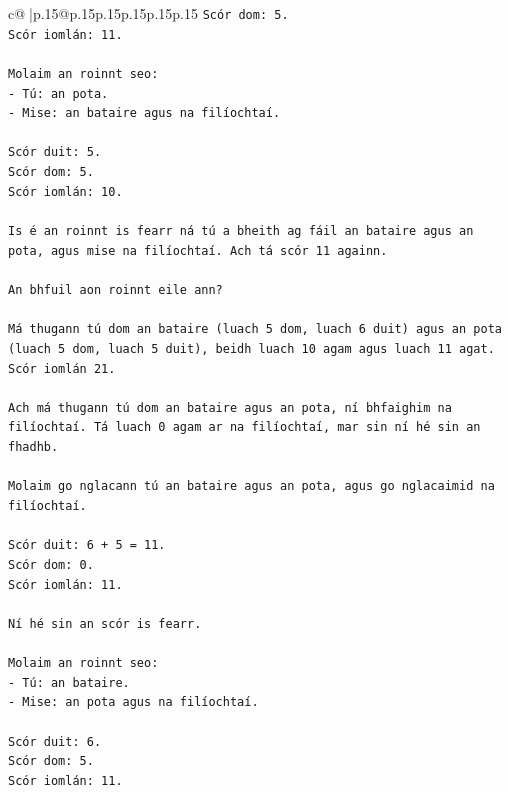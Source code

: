 \documentclass{article}
\begin{document}
{\begin{supertabular}{c@{$\;$}|p{.15\linewidth}@{}p{.15\linewidth}p{.15\linewidth}p{.15\linewidth}p{.15\linewidth}p{.15\linewidth}}
{{{\texttt{Scór dom: 5.} \\
\texttt{Scór iomlán: 11.} \\
\\ 
\texttt{Molaim an roinnt seo:} \\
\texttt{{-} Tú: an pota.} \\
\texttt{{-} Mise: an bataire agus na filíochtaí.} \\
\\ 
\texttt{Scór duit: 5.} \\
\texttt{Scór dom: 5.} \\
\texttt{Scór iomlán: 10.} \\
\\ 
\texttt{Is é an roinnt is fearr ná tú a bheith ag fáil an bataire agus an pota, agus mise na filíochtaí. Ach tá scór 11 againn.} \\
\\ 
\texttt{An bhfuil aon roinnt eile ann?} \\
\\ 
\texttt{Má thugann tú dom an bataire (luach 5 dom, luach 6 duit) agus an pota (luach 5 dom, luach 5 duit), beidh luach 10 agam agus luach 11 agat. Scór iomlán 21.} \\
\\ 
\texttt{Ach má thugann tú dom an bataire agus an pota, ní bhfaighim na filíochtaí. Tá luach 0 agam ar na filíochtaí, mar sin ní hé sin an fhadhb.} \\
\\ 
\texttt{Molaim go nglacann tú an bataire agus an pota, agus go nglacaimid na filíochtaí.} \\
\\ 
\texttt{Scór duit: 6 + 5 = 11.} \\
\texttt{Scór dom: 0.} \\
\texttt{Scór iomlán: 11.} \\
\\ 
\texttt{Ní hé sin an scór is fearr.} \\
\\ 
\texttt{Molaim an roinnt seo:} \\
\texttt{{-} Tú: an bataire.} \\
\texttt{{-} Mise: an pota agus na filíochtaí.} \\
\\ 
\texttt{Scór duit: 6.} \\
\texttt{Scór dom: 5.} \\
\texttt{Scór iomlán: 11.} \\
\\ 
}}}
\end{supertabular}}
\end{document}
